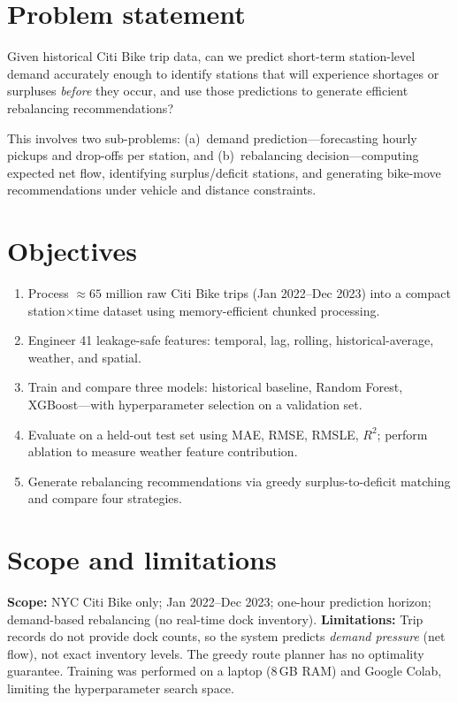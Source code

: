 \documentclass[12pt,a4paper]{report}
\begin{document}
\section{Problem statement}

Given historical Citi Bike trip data, can we predict short-term
station-level demand accurately enough to identify stations that
will experience shortages or surpluses \emph{before} they occur, and
use those predictions to generate efficient rebalancing
recommendations?

This involves two sub-problems: (a)~demand prediction---forecasting
hourly pickups and drop-offs per station, and (b)~rebalancing
decision---computing expected net flow, identifying surplus/deficit
stations, and generating bike-move recommendations under vehicle
and distance constraints.

\section{Objectives}

\begin{enumerate}
  \item Process $\approx 65$ million raw Citi Bike trips (Jan
        2022--Dec 2023) into a compact station$\times$time dataset
        using memory-efficient chunked processing.
  \item Engineer 41 leakage-safe features: temporal, lag, rolling,
        historical-average, weather, and spatial.
  \item Train and compare three models: historical baseline, Random
        Forest, XGBoost---with hyperparameter selection on a
        validation set.
  \item Evaluate on a held-out test set using MAE, RMSE, RMSLE, $R^2$;
        perform ablation to measure weather feature contribution.
  \item Generate rebalancing recommendations via greedy
        surplus-to-deficit matching and compare four strategies.
\end{enumerate}

\section{Scope and limitations}

\textbf{Scope:} NYC Citi Bike only; Jan 2022--Dec 2023; one-hour
prediction horizon; demand-based rebalancing (no real-time dock
inventory). \textbf{Limitations:} Trip records do not provide dock
counts, so the system predicts \emph{demand pressure} (net flow),
not exact inventory levels. The greedy route planner has no
optimality guarantee. Training was performed on a laptop (8\,GB
RAM) and Google Colab, limiting the hyperparameter search space.
\end{document}
